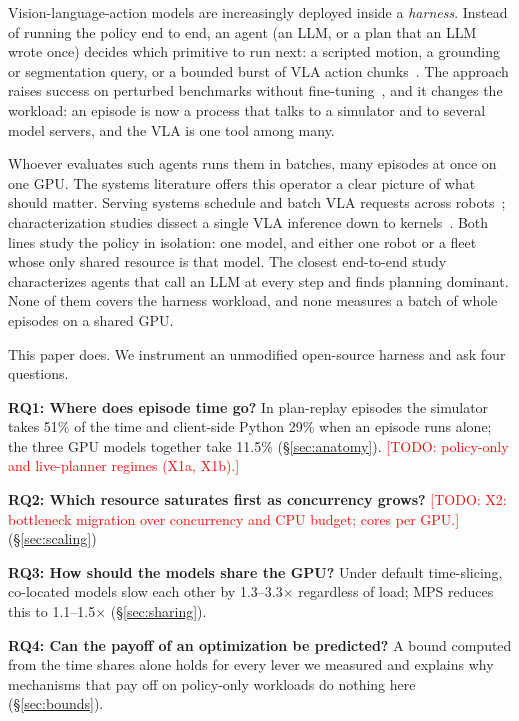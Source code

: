 \documentclass[conference,10pt]{IEEEtran}
\newcommand{\pct}[1]{#1\%}
\newcommand{\num}[1]{#1}                        %
\newcommand{\todo}[1]{\textcolor{red}{[TODO: #1]}}
\newcommand{\rqa}{RQ1}\newcommand{\rqb}{RQ2}\newcommand{\rqc}{RQ3}\newcommand{\rqd}{RQ4}
\begin{document}
Vision-language-action models are increasingly deployed inside a \emph{harness}. Instead of
running the policy end to end, an agent (an LLM, or a plan that an LLM wrote once) decides
which primitive to run next: a scripted motion, a grounding or segmentation query, or a
bounded burst of VLA action chunks~\cite{rpent,capx}. The approach raises success on
perturbed benchmarks without fine-tuning~\cite{rpent,liberopro}, and it changes the
workload: an episode is now a process that talks to a simulator and to several model
servers, and the VLA is one tool among many.

Whoever evaluates such agents runs them in batches, many episodes at once on one GPU. The
systems literature offers this operator a clear picture of what should matter. Serving
systems schedule and batch VLA requests across robots~\cite{kairos,rosa,armory,robion,firmvla};
characterization studies dissect a single VLA inference down to
kernels~\cite{jung2027beyond,vlaperf,zhou2026xpu,kercolle}. Both lines study the policy in
isolation: one model, and either one robot or a fleet whose only shared resource is that
model. The closest end-to-end study~\cite{wan2025ispass} characterizes agents that call an
LLM at every step and finds planning dominant. None of them covers the harness workload,
and none measures a batch of whole episodes on a shared GPU.

This paper does. We instrument an unmodified open-source harness and ask four questions.

\textbf{\rqa: Where does episode time go?} In plan-replay episodes the simulator takes
\pct{\num{51}} of the time and client-side Python \pct{\num{29}} when an episode runs alone;
the three GPU models together take \pct{\num{11.5}} (\S\ref{sec:anatomy}). \todo{policy-only
and live-planner regimes (X1a, X1b).}

\textbf{\rqb: Which resource saturates first as concurrency grows?} \todo{X2: bottleneck
migration over concurrency and CPU budget; cores per GPU.} (\S\ref{sec:scaling})

\textbf{\rqc: How should the models share the GPU?} Under default time-slicing, co-located
models slow each other by 1.3--3.3$\times$ regardless of load; MPS reduces this to
1.1--1.5$\times$ (\S\ref{sec:sharing}).

\textbf{\rqd: Can the payoff of an optimization be predicted?} A bound computed from the
time shares alone holds for every lever we measured and explains why mechanisms that pay off
on policy-only workloads do nothing here (\S\ref{sec:bounds}).
\end{document}

